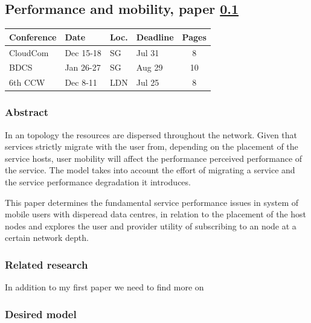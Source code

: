 \subsection{Performance and mobility, paper \ref{paper:performance_mobility}}
\label{paper:performance_mobility}

\begin{table}[H]
\small
\begin{tabular}{|l|l|l|l|c|} \hline
\textbf{Conference} & \textbf{Date} & \textbf{Loc.} & \textbf{Deadline} & \textbf{Pages} \\ \hline
CloudCom & Dec 15-18 & SG & Jul 31 & 8 \\ \hline
BDCS & Jan 26-27 & SG & Aug 29 & 10	\\ \hline
6th CCW & Dec 8-11 & LDN & Jul 25 & 8 \\ \hline
\end{tabular}
\end{table}

\subsubsection{Abstract}
In an \xcloud topology the resources are dispersed throughout the network. Given that services strictly migrate with the user from, depending on the placement of the service hosts, user mobility will affect the performance perceived performance of the service. The model takes into account the effort of migrating a service and the service performance degradation it introduces.

This paper determines the fundamental service performance issues in system of mobile users with disperead data centres, in relation to the placement of the \xcloud host nodes and explores the user and provider utility of subscribing to an \xcloud node at a certain network depth.

\subsubsection{Related research}
In addition to my first paper we need to find more on 

\subsubsection{Desired model}

